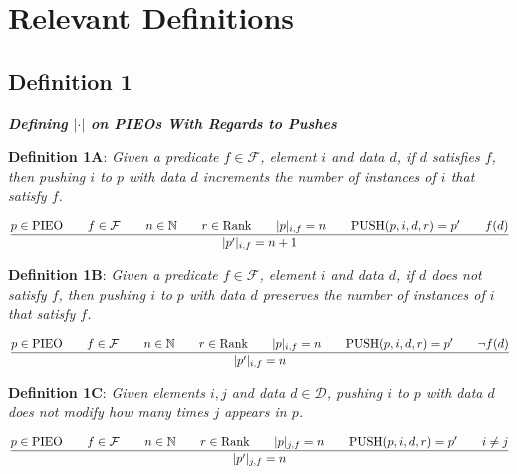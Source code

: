 \documentclass{article}
\begin{document}
\section{Relevant Definitions}

\subsection{Definition 1}
\textbf{\textit{Defining $| \cdot |$ on PIEOs With Regards to Pushes}}\newline


\textbf{Definition 1A}: \textit{Given a predicate $f \in \mathcal{F}$, element $i$ and data $d$, if $d$ satisfies $f$, then pushing $i$ to $p$ with data $d$ increments the number of instances of $i$ that satisfy $f$.}

$$\frac{p \in \text{PIEO}  \hspace{0.7cm} f \in \mathcal{F} \hspace{0.7cm} n \in \mathbb{N} \hspace{0.7cm} r \in \text{Rank} \hspace{0.7cm} |p|_{i, f} = n \hspace{0.7cm} \text{PUSH}(p, i, d, r) = p' \hspace{0.7cm} f(d)}{|p'|_{i, f} = n+1}$$

\textbf{Definition 1B}: \textit{Given a predicate $f \in \mathcal{F}$, element $i$ and data $d$, if $d$ does not satisfy $f$, then pushing $i$ to $p$ with data $d$ preserves the number of instances of $i$ that satisfy $f$.}

$$\frac{p \in \text{PIEO}  \hspace{0.7cm} f \in \mathcal{F} \hspace{0.7cm} n \in \mathbb{N} \hspace{0.7cm} r \in \text{Rank} \hspace{0.7cm} |p|_{i, f} = n \hspace{0.7cm} \text{PUSH}(p, i, d, r) = p' \hspace{0.7cm} \neg f(d)}{|p'|_{i, f} = n}$$

\textbf{Definition 1C}: \textit{Given elements $i, j$ and data $d \in \mathcal{D}$, pushing $i$ to $p$ with data $d$ does not modify how many times $j$ appears in $p$.}

$$\frac{p \in \text{PIEO}  \hspace{0.7cm} f \in \mathcal{F} \hspace{0.7cm} n \in \mathbb{N} \hspace{0.7cm} r \in \text{Rank} \hspace{0.7cm} |p|_{j, f} = n \hspace{0.7cm} \text{PUSH}(p, i, d, r) = p' \hspace{0.7cm} i \neq j}{|p'|_{j, f} = n}$$
\end{document}
